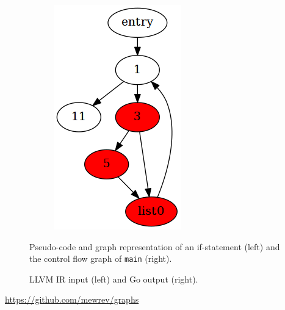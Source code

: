 \documentclass[a2paper,landscape,fontscale=0.35]{baposter}
\begin{document}
\begin{poster}
{\begin{figure}[H]
\begin{subfigure}[ht]{0.50\textwidth}
			\includegraphics[width=\textwidth]{inc/foo.png}
		\end{subfigure}
		\caption{Pseudo-code and graph representation of an if-statement (left) and the control flow graph of \texttt{main} (right).}
	\end{figure}
}

{
	\begin{figure}[H]
		\centering
		\begin{subfigure}[ht]{0.61\textwidth}
			
		\end{subfigure}
		\quad
		\begin{subfigure}[ht]{0.26\textwidth}
			
		\end{subfigure}
		\caption{LLVM IR input (left) and Go output (right).}
	\end{figure}
}

{
	\url{https://github.com/mewrev/graphs}
}

\end{poster}
\end{document}
